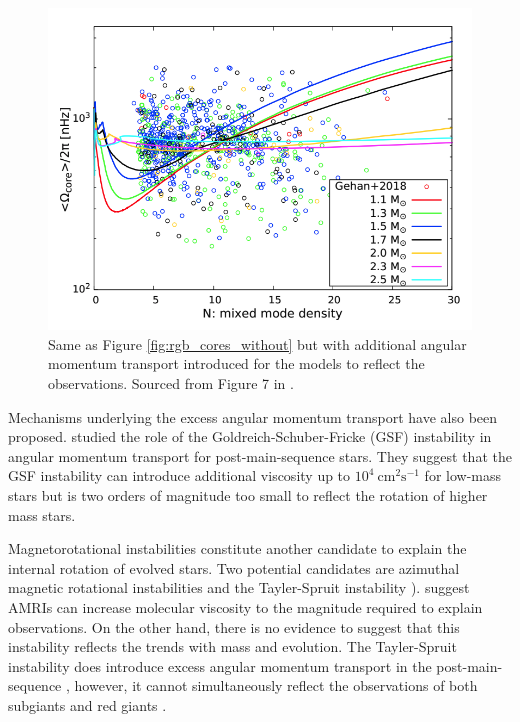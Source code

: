 \begin{figure}[h]
    \includegraphics[width=\textwidth]{Figures/intro_figures/rgb_core_rot.png}
    \caption[Average core rotation rates of red giants against mixed mode density without additional angular momentum transport.]{Same as Figure \ref{fig:rgb_cores_without} but with additional angular momentum transport introduced for the models to reflect the observations.
    Sourced from Figure 7 in \citet{moyano_asteroseismology_2022}.}
    \label{fig:rgb_cores_with}
\end{figure}


Mechanisms underlying the excess angular momentum transport have also been proposed.
\citet{barker_angular_2019,barker_angular_2020} studied the role of the Goldreich-Schuber-Fricke (GSF) instability \citep{goldreich_differential_1967,fricke_rotation_1967} in angular momentum transport for post-main-sequence stars.
They suggest that the GSF instability can introduce additional viscosity up to $10^4 \ \text{cm}^2 \text{s}^{-1}$ for low-mass stars but is two orders of magnitude too small to reflect the rotation of higher mass stars.

Magnetorotational instabilities constitute another candidate to explain the internal rotation of evolved stars.
Two potential candidates are azimuthal magnetic rotational instabilities  and the Tayler-Spruit instability \citep[see ][]{spruit_dynamo_2002}).
\citet{rudiger_diffusive_2015} suggest AMRIs can increase molecular viscosity to the magnitude required to explain observations.
On the other hand, there is no evidence to suggest that this instability reflects the trends with mass and evolution.
The Tayler-Spruit instability does introduce excess angular momentum transport in the post-main-sequence \citep{fuller_slowing_2019}, however, it cannot simultaneously reflect the observations of both subgiants and red giants \citep{eggenberger_asteroseismology_2019,den_hartogh_constraining_2019}.

